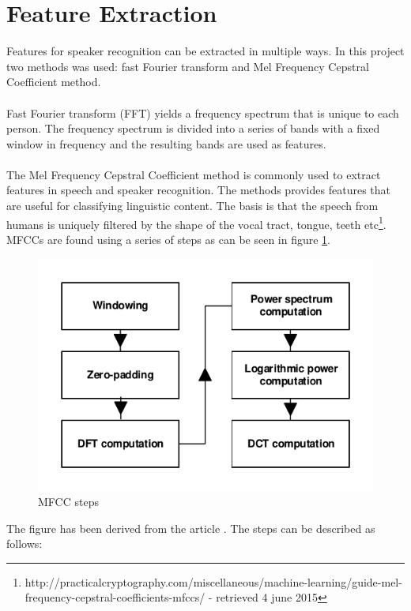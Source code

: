 \section{Feature Extraction}
Features for speaker recognition can be extracted in multiple ways. In this project two methods was used: fast Fourier transform and Mel Frequency Cepstral Coefficient method.
\\\ \\
Fast Fourier transform (FFT) yields a frequency spectrum that is unique to each person. The frequency spectrum is divided into a series of bands with a fixed window in frequency and the resulting bands are used as features. 
\\\ \\
The Mel Frequency Cepstral Coefficient method is commonly used to extract features in speech and speaker recognition. The methods provides features that are useful for classifying linguistic content. The basis is that the speech from humans is uniquely filtered by the shape of the vocal tract, tongue, teeth etc\footnote{http://practicalcryptography.com/miscellaneous/machine-learning/guide-mel-frequency-cepstral-coefficients-mfccs/ - retrieved 4 june 2015}. MFCCs are found using a series of steps as can be seen in figure \ref{fig:MFCCsteps}.
\begin{figure}[H]
\centering
\includegraphics[scale=1]{billeder/MFCCsteps}
\caption{MFCC steps}
\label{fig:MFCCsteps}
\end{figure}
The figure has been derived from the article \cite{Sahidullah2012}. The steps can be described as follows:
